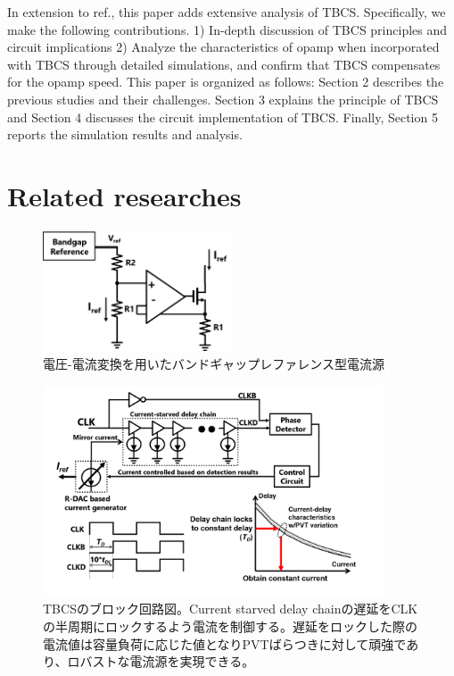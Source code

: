 \documentclass[letterpaper, 10 pt, conference]{ieeeconf}  %
\begin{document}
In extension to ref.\cite{yoshioka201728, yoshioka2019digital}, this paper adds extensive analysis of TBCS. Specifically, we make the following contributions. 1) In-depth discussion of TBCS principles and circuit implications 2) Analyze the characteristics of opamp when incorporated with TBCS through detailed simulations, and confirm that TBCS compensates for the opamp speed. 
This paper is organized as follows: Section 2 describes the previous studies and their challenges. Section 3 explains the principle of TBCS and Section 4 discusses the circuit implementation of TBCS. Finally, Section 5 reports the simulation results and analysis.

\section{Related researches}
\begin{figure}[!]
\centering
 \includegraphics[width=0.5\textwidth]{figs/fig1.png}
  \caption{電圧-電流変換を用いたバンドギャップレファレンス型電流源}
\label{bandgap}
\end{figure}

\begin{figure}[!]
\centering
 \includegraphics[width=0.9\textwidth]{figs/fig2.png}
  \caption{TBCSのブロック回路図。Current starved delay chainの遅延をCLKの半周期にロックするよう電流を制御する。遅延をロックした際の電流値は容量負荷に応じた値となりPVTばらつきに対して頑強であり、ロバストな電流源を実現できる。}
  \label{fig2}
\end{figure}
\end{document}
